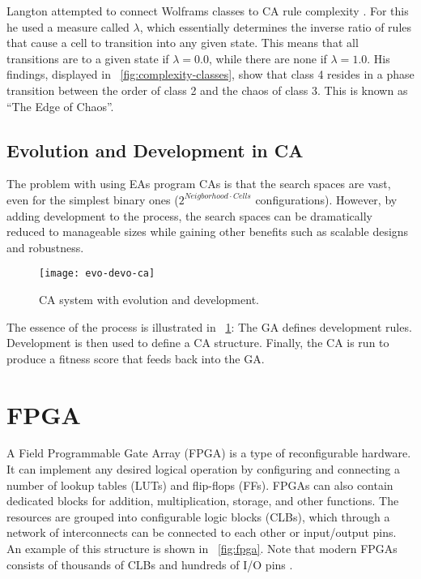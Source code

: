 Langton attempted to connect Wolframs classes to CA rule complexity \cite{langton1990edgeofchaos}.
For this he used a measure called $\lambda$, which essentially determines the inverse ratio of rules that cause a cell to transition into any given state.
This means that all transitions are to a given state if $\lambda=0.0$, while there are none if $\lambda=1.0$.
His findings, displayed in \figurename~\ref{fig:complexity-classes}, show that class 4 resides in a phase transition between the order of class 2 and the chaos of class 3.
This is known as ``The Edge of Chaos''.

\subsection{Evolution and Development in CA}

The problem with using EAs program CAs is that the search spaces are vast, even for the simplest binary ones ($2^{Neigborhood \cdot Cells}$ configurations\footnotemark).
However, by adding development to the process, the search spaces can be dramatically reduced to manageable sizes while gaining other benefits such as scalable designs and robustness.


\begin{figure}[!ht]
    \centering
    \texttt{[image: evo-devo-ca]}
    \caption[CA system with evolution and development]{
        CA system with evolution and development.
    }
    \label{fig:evo-devo-ca}
\end{figure}

The essence of the process is illustrated in \figurename~\ref{fig:evo-devo-ca}:
The GA defines development rules.
Development is then used to define a CA structure.
Finally, the CA is run to produce a fitness score that feeds back into the GA.


\section{FPGA}

A Field Programmable Gate Array (FPGA) is a type of reconfigurable hardware.
It can implement any desired logical operation by configuring and connecting a number of lookup tables (LUTs) and flip-flops (FFs).
FPGAs can also contain dedicated blocks for addition, multiplication, storage, and other functions.
The resources are grouped into configurable logic blocks (CLBs), which through a network of interconnects can be connected to each other or input/output pins.
An example of this structure is shown in \figurename~\ref{fig:fpga}.
Note that modern FPGAs consists of thousands of CLBs and hundreds of I/O pins \cite{ds160}.

